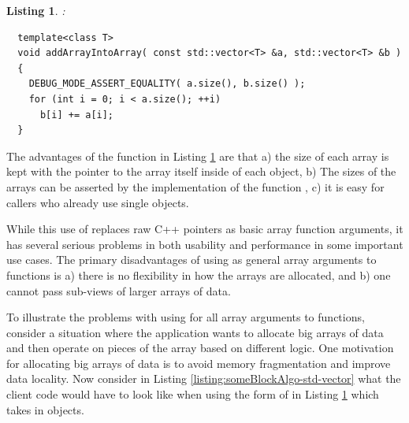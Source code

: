 \documentclass[pdf,ps2pdf,11pt]{SANDreport}
\newtheorem{listing}{Listing}
\begin{document}
\begin{listing}:\\
\label{listing:addArrayIntoArray-std-vector}
{\small\begin{verbatim}
  template<class T>
  void addArrayIntoArray( const std::vector<T> &a, std::vector<T> &b )
  {
    DEBUG_MODE_ASSERT_EQUALITY( a.size(), b.size() );
    for (int i = 0; i < a.size(); ++i)
      b[i] += a[i];
  }
\end{verbatim}}
\end{listing}

The advantages of the function in Listing
{}\ref{listing:addArrayIntoArray-std-vector} are that a) the size of
each array is kept with the pointer to the array itself inside of each
{} object, b) The sizes of the arrays can be
asserted by the implementation of the function
{}, c) it is easy for callers who
already use single {} objects.

While this use of {} replaces raw C++ pointers as
basic array function arguments, it has several serious problems in
both usability and performance in some important use cases.  The
primary disadvantages of using {} as general array
arguments to functions is a) there is no flexibility in how the arrays
are allocated, and b) one cannot pass sub-views of larger arrays of
data.

To illustrate the problems with using {} for all
array arguments to functions, consider a situation where the
application wants to allocate big arrays of data and then operate on
pieces of the array based on different logic.  One motivation for
allocating big arrays of data is to avoid memory fragmentation and
improve data locality.  Now consider in Listing
{}\ref{listing:someBlockAlgo-std-vector} what the client code would
have to look like when using the form of
{} in Listing
{}\ref{listing:addArrayIntoArray-std-vector} which takes in
{} objects.
\end{document}
